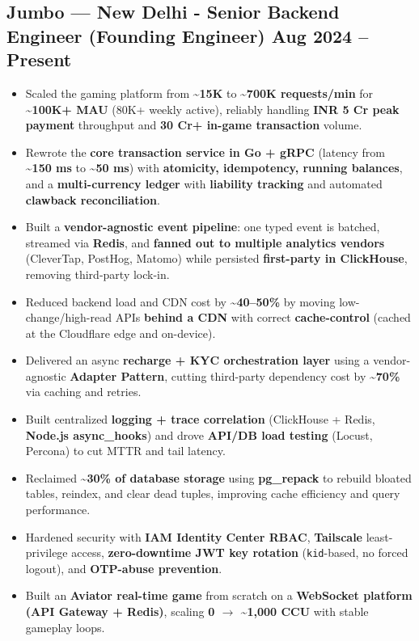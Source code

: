 \documentclass[a4paper,10pt]{article}
\begin{document}
\subsection*{{\color{accent}Jumbo --- New Delhi} \textnormal{-} Senior Backend Engineer (Founding Engineer) \textbar{} Aug 2024 -- Present}
\begin{itemize}
  \item Scaled the gaming platform from \textbf{\textasciitilde{}15K} to \textbf{\textasciitilde{}700K requests/min} for \textbf{\textasciitilde{}100K+ MAU} (80K+ weekly active), reliably handling \textbf{INR 5 Cr peak payment} throughput and \textbf{30 Cr+ in-game transaction} volume.
  \item Rewrote the \textbf{core transaction service in Go + gRPC} (latency from \textbf{\textasciitilde{}150 ms} to \textbf{\textasciitilde{}50 ms}) with \textbf{atomicity, idempotency, running balances}, and a \textbf{multi-currency ledger} with \textbf{liability tracking} and automated \textbf{clawback reconciliation}.
  \item Built a \textbf{vendor-agnostic event pipeline}: one typed event is batched, streamed via \textbf{Redis}, and \textbf{fanned out to multiple analytics vendors} (CleverTap, PostHog, Matomo) while persisted \textbf{first-party in ClickHouse}, removing third-party lock-in.
  \item Reduced backend load and CDN cost by \textbf{\textasciitilde{}40--50\%} by moving low-change/high-read APIs \textbf{behind a CDN} with correct \textbf{cache-control} (cached at the Cloudflare edge and on-device).
  \item Delivered an async \textbf{recharge + KYC orchestration layer} using a vendor-agnostic \textbf{Adapter Pattern}, cutting third-party dependency cost by \textbf{\textasciitilde{}70\%} via caching and retries.
  \item Built centralized \textbf{logging + trace correlation} (ClickHouse + Redis, \textbf{Node.js async\_hooks}) and drove \textbf{API/DB load testing} (Locust, Percona) to cut MTTR and tail latency.
  \item Reclaimed \textbf{\textasciitilde{}30\% of database storage} using \textbf{pg\_repack} to rebuild bloated tables, reindex, and clear dead tuples, improving cache efficiency and query performance.
  \item Hardened security with \textbf{IAM Identity Center RBAC}, \textbf{Tailscale} least-privilege access, \textbf{zero-downtime JWT key rotation} (\texttt{kid}-based, no forced logout), and \textbf{OTP-abuse prevention}.
  \item Built an \textbf{Aviator real-time game} from scratch on a \textbf{WebSocket platform (API Gateway + Redis)}, scaling \textbf{0 $\rightarrow$ \textasciitilde{}1,000 CCU} with stable gameplay loops.
\end{itemize}
\end{document}
